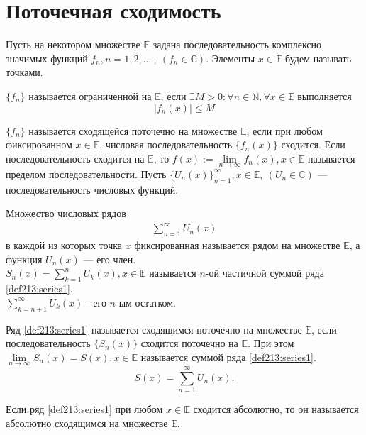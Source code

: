 \section{Поточечная сходимость}
Пусть на некотором множестве $\mathbb{E}$ задана последовательность
комплексно значимых функций $f_n, n = 1, 2, \dots \ , \ (f_n \in \mathbb{C})$.
Элементы $x \in \mathbb{E}$ будем называть точками.
\begin{definition}
  $\{f_n\}$ называется ограниченной на $\mathbb{E}$, если
  $\exists M > 0: \forall n \in \mathbb{N}, \forall x \in \mathbb{E}$ выполняется
  $$|f_n(x)| \leq M$$
\end{definition}

\begin{definition}
  $\{f_n\}$ называется сходящейся поточечно на множестве $\mathbb{E}$, если
  при любом фиксированном $x \in \mathbb{E}$, числовая последовательность
  $\{f_n(x)\}$ сходится. Если последовательность сходится на $\mathbb{E}$,
  то $f(x) := \lim\limits_{n \to \infty} f_n(x), x \in \mathbb{E}$ называется
  пределом последовательности. Пусть
  $\{U_n(x)\}_{n = 1}^\infty, x \in \mathbb{E}, \ (U_n \in \mathbb{C})$
  --- последовательность числовых функций.
\end{definition}

\begin{definition}
  Множество числовых рядов
  \begin{gather}
    \sum\limits_{n = 1}^{\infty} U_n(x) \label{def213:series1}
  \end{gather}
  в каждой из которых точка $x$ фиксированная называется рядом на множестве
  $\mathbb{E}$, а функция $U_n(x)$ --- его член. \\
  $S_n(x) = \sum\limits_{k = 1}^{n} U_k(x), x \in \mathbb{E}$ называется
  $n$-ой частичной суммой ряда \eqref{def213:series1}. \\
  $\sum\limits_{k = n + 1}^{\infty} U_k(x)$ - его $n$-ым остатком.
\end{definition}

\begin{definition}
  Ряд \eqref{def213:series1} называется сходящимся поточечно на множестве
  $\mathbb{E}$, если последовательность $\{S_n(x)\}$ сходится поточечно на
  $\mathbb{E}$. При этом $\lim\limits_{n \to \infty} S_n(x) = S(x), x \in \mathbb{E}$
  называется суммой ряда \eqref{def213:series1}.
  $$S(x) = \sum\limits_{n = 1}^{\infty} U_n(x).$$
\end{definition}

\begin{definition}
  Если ряд \eqref{def213:series1} при любом $x \in \mathbb{E}$ сходится абсолютно,
  то он называется абсолютно сходящимся на множестве $\mathbb{E}$.
\end{definition}

